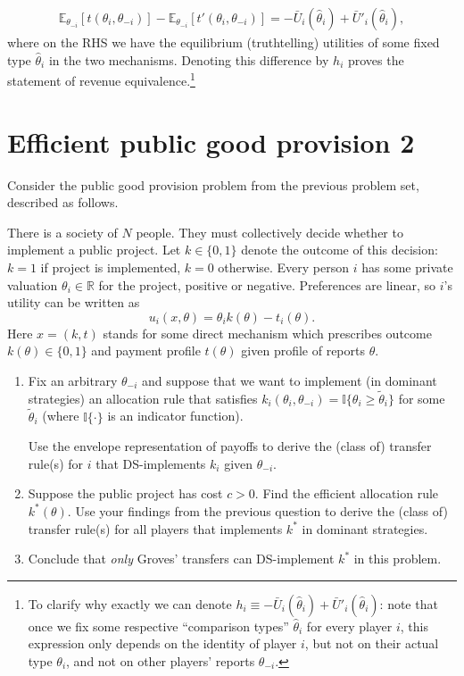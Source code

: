 \documentclass[a4paper]{article}
\begin{document}
	\begin{align*}
		\mathbb{E}_{\theta_{-i}}\left[ t(\theta_i,\theta_{-i}) \right] - \mathbb{E}_{\theta_{-i}}\left[ t'(\theta_i,\theta_{-i}) \right]
		=
		-\bar{U}_i(\hat{\theta}_i) + \bar{U}'_i(\hat{\theta}_i),
	\end{align*}
	where on the RHS we have the equilibrium (truthtelling) utilities of some fixed type $\hat{\theta}_i$ in the two mechanisms. Denoting this difference by $h_i$ proves the statement of revenue equivalence.\footnote{To clarify why exactly we can denote $h_i \equiv -\bar{U}_i(\hat{\theta}_i) + \bar{U}'_i(\hat{\theta}_i)$: note that once we fix some respective ``comparison types'' $\hat{\theta}_i$ for every player $i$, this expression only depends on the identity of player $i$, but not on their actual type $\theta_i$, and not on other players' reports $\theta_{-i}$.}
\fi


\section{Efficient public good provision 2}

	Consider the public good provision problem from the previous problem set, described as follows.
	
	There is a society of $N$ people. They must collectively decide whether to implement a public project. Let $k \in \{0,1\}$ denote the outcome of this decision: $k=1$ if project is implemented, $k=0$ otherwise. Every person $i$ has some private valuation $\theta_i \in \mathbb{R}$ for the project, positive or negative. Preferences are linear, so $i$'s utility can be written as
	$$
		u_i(x,\theta) = \theta_i k(\theta) - t_i(\theta).
	$$
	Here $x=(k,t)$ stands for some direct mechanism which prescribes outcome $k(\theta) \in \{0,1\}$ and payment profile $t(\theta)$ given profile of reports $\theta$.
	
	\begin{enumerate}
		\item Fix an arbitrary $\theta_{-i}$ and suppose that we want to implement (in dominant strategies) an allocation rule that satisfies $k_i(\theta_i, \theta_{-i}) = \mathbb{I}\{\theta_i \geq \tilde{\theta}_i \}$ for some $\tilde{\theta}_i$ (where $\mathbb{I}\{\cdot\}$ is an indicator function).
		
		Use the envelope representation of payoffs to derive the (class of) transfer rule(s) for $i$ that DS-implements $k_i$ given $\theta_{-i}$.
		
		\item Suppose the public project has cost $c > 0$. Find the efficient allocation rule $k^*(\theta)$. Use your findings from the previous question to derive the (class of) transfer rule(s) for all players that implements $k^*$ in dominant strategies.
		
		\item Conclude that \emph{only} Groves' transfers can DS-implement $k^*$ in this problem.
	\end{enumerate}
\end{document}
